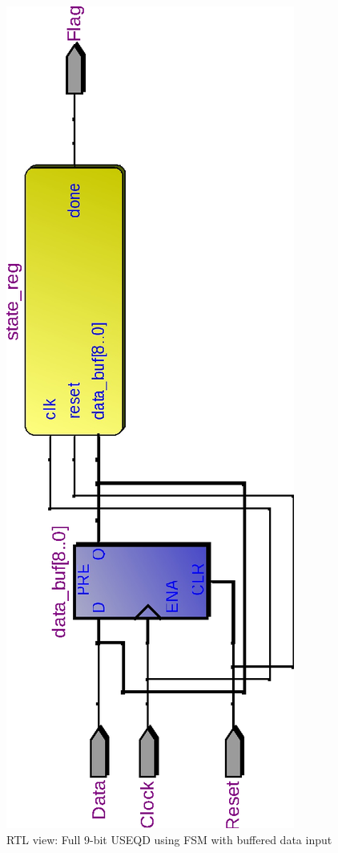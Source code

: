 \documentclass[10pt,a4paper]{report}
\begin{document}
\begin{figure}
\includegraphics[scale=0.6,angle=-90]{graphs/seq_test1.rtl_010110011.eps}
\caption{\small{RTL view: Full 9-bit USEQD using FSM with buffered data input}} \label{wave:usd:1}
\end{figure}
\end{document}
